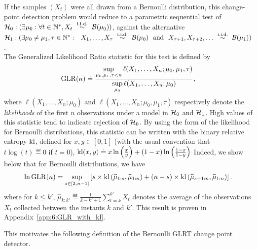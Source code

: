 If the samples $(X_t)$ were all drawn from a Bernoulli distribution, this change-point detection problem would reduce to a parametric sequential test of
$\cH_0 : (\exists \mu_0: \forall t\in\N^*, X_t \ \overset{\text{i.i.d.}}{\sim} \ \cB(\mu_0))$,
against the alternative
$\cH_1 : (\exists \mu_0 \neq \mu_1, \tau \in \N^*: \ \  X_1, \dots, X_\tau \ \overset{\text{i.i.d.}}{\sim} \ \cB(\mu_0) \ \ \text{and} \ \ X_{\tau+1}, X_{\tau+2}, \dots \ \overset{\text{i.i.d.}}{\sim} \ \cB(\mu_1))$.\\
%
The Generalized Likelihood Ratio statistic for this test is defined by
\begin{equation}\label{eq:6:firstDefGLRT}
    \mathrm{GLR}(n) \overset{.}{=} \frac{\sup\limits_{\mu_0,\mu_1,\tau < n}\ell(X_1, \dots, X_n ; \mu_0,\mu_1,\tau)}{\sup\limits_{\mu_0}\ell(X_1, \dots, X_n ; \mu_0)},
\end{equation}
%
where $\ell(X_1, \dots, X_n ; \mu_0)$ and $\ell(X_1, \dots, X_n ; \mu_0,\mu_1,\tau)$ respectively denote the \emph{likelihoods} of the first $n$ observations under a model in $\mathcal{H}_0$ and $\mathcal{H}_1$.
High values of this statistic tend to indicate rejection of $\mathcal{H}_0$.
%
By using the form of the likelihood for Bernoulli distributions, this statistic can be written with the binary relative entropy $\mathrm{kl}$, defined for $x,y\in[0,1]$ (with the usual convention that $t \log(t) \eqdef 0$ if $t=0$),
$\mathrm{kl}(x,y) \overset{.}{=} x \ln\left(\frac{x}{y}\right) + (1-x)\ln\left(\frac{1-x}{1-y}\right)$
%
Indeed, we show below
that for Bernoulli distributions, we have
\begin{equation}\label{eq:6:secondDefGLRT}
    \ln \mathrm{GLR}(n) = \sup_{s \in [2,n-1]} \left[s \times \mathrm{kl}\left(\widehat{\mu}_{1:s},\widehat{\mu}_{1:n}\right) + (n-s) \times \mathrm{kl}\left(\widehat{\mu}_{s+1:n},\widehat{\mu}_{1:n}\right)\right].
\end{equation}
%
where for $k \leq k'$, $\widehat{\mu}_{k:k'} \eqdef \frac{1}{k - k' + 1} \sum\limits_{t=k}^{k'} X_t$ denotes the average of the observations $X_t$ collected between the instants $k$ and $k'$.
This result is proven in Appendix~\ref{app:6:GLR_with_kl}.
%

This motivates the following definition of the Bernoulli GLRT change point detector.

